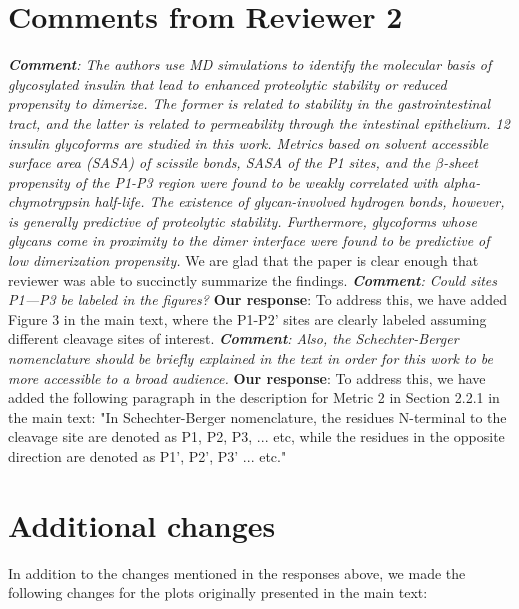 \documentclass[9pt]{elife}
\begin{document}
\section*{Comments from Reviewer 2}
\textit{\textbf{Comment}: The authors use MD simulations to identify the molecular basis of glycosylated insulin that lead to enhanced proteolytic stability or reduced propensity to dimerize. The former is related to stability in the gastrointestinal tract, and the latter is related to permeability through the intestinal epithelium. 12 insulin glycoforms are studied in this work. Metrics based on solvent accessible surface area (SASA) of scissile bonds, SASA of the P1 sites, and the $\beta$-sheet propensity of the P1-P3 region were found to be weakly correlated with alpha-chymotrypsin half-life. The existence of glycan-involved hydrogen bonds, however, is generally predictive of proteolytic stability. Furthermore, glycoforms whose glycans come in proximity to the dimer interface were found to be predictive of low dimerization propensity.}
\newline
We are glad that the paper is clear enough that reviewer was able to succinctly summarize the findings.
\newline
\indent
\textit{\textbf{Comment}:
Could sites P1—P3 be labeled in the figures? }
\newline
\indent 
{\bf Our response}: To address this, we have added Figure 3 in the main text, where the P1-P2' sites are clearly labeled assuming different cleavage sites of interest. 
\newline
\newline
\indent
\textit{\textbf{Comment}:
Also, the Schechter-Berger nomenclature should be briefly explained in the text in order for this work to be more accessible to a broad audience.}
\newline
\indent 
{\bf Our response}: To address this, we have added the following paragraph in the description for Metric 2 in Section 2.2.1 in the main text: "In Schechter-Berger nomenclature, the residues N-terminal to the cleavage site are denoted as P1, P2, P3, ... etc, while the residues in the opposite direction are denoted as P1', P2', P3' ... etc."

\section*{Additional changes}
In addition to the changes mentioned in the responses above, we made the following changes for the plots originally presented in the main text:
\end{document}
